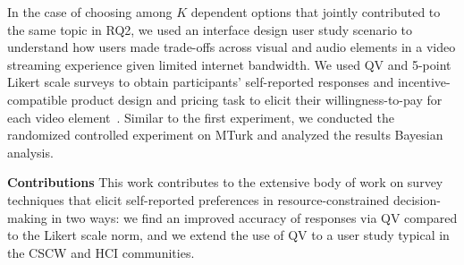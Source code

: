In the case of choosing among $K$ dependent options that jointly contributed to the same topic in RQ2, we used an interface design user study scenario to understand how users made trade-offs across visual and audio elements in a video streaming experience given limited internet bandwidth. We used QV and 5-point Likert scale surveys to obtain participants' self-reported responses and {}incentive-compatible product design and pricing task to elicit their willingness-to-pay for each video element~\cite{roth1982incentive}. Similar to the first experiment, we conducted the randomized controlled experiment on MTurk and analyzed the results {} Bayesian analysis.

\textbf{Contributions} This work contributes to the extensive body of work on survey techniques that elicit self-reported preferences in resource-constrained decision-making in two ways: we find an improved accuracy of responses via QV compared to the Likert scale norm, and we extend the use of QV to a user study typical in the CSCW and HCI communities.

